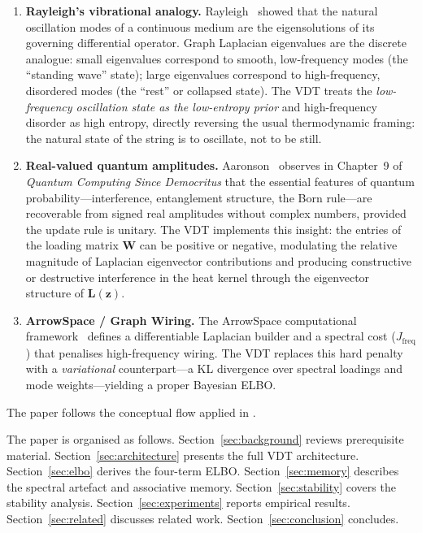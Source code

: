 \documentclass[11pt,a4paper]{article}
\newcommand{\Lmat}{\mathbf{L}}
\newcommand{\Wmat}{\mathbf{W}}
\begin{document}
\begin{enumerate}
  \item \textbf{Rayleigh's vibrational analogy.}
        Rayleigh~\cite{rayleigh1877} showed that the natural oscillation modes
        of a continuous medium are the eigensolutions of its governing
        differential operator.  Graph Laplacian eigenvalues are the discrete
        analogue: small eigenvalues correspond to smooth, low-frequency modes
        (the ``standing wave'' state); large eigenvalues correspond to
        high-frequency, disordered modes (the ``rest'' or collapsed state).
        The VDT treats the \emph{low-frequency oscillation state as the
        low-entropy prior} and high-frequency disorder as high entropy,
        directly reversing the usual thermodynamic framing: the natural state
        of the string is to oscillate, not to be still.

  \item \textbf{Real-valued quantum amplitudes.}
        Aaronson~\cite{aaronson2013} observes in Chapter~9 of
        \emph{Quantum Computing Since Democritus} that the essential features
        of quantum probability---interference, entanglement structure,
        the Born rule---are recoverable from signed real amplitudes without
        complex numbers, provided the update rule is unitary.
        The VDT implements this insight: the entries of the loading matrix
        $\Wmat$ can be positive or negative, modulating the relative
        magnitude of Laplacian eigenvector contributions and producing
        constructive or destructive interference in the heat kernel through
        the eigenvector structure of $\Lmat(\mathbf{z})$.

  \item \textbf{ArrowSpace / Graph Wiring.}
        The ArrowSpace computational framework~\cite{moriondo2026arrowspace}
        defines a differentiable Laplacian builder and a spectral cost
        ($J_{\text{freq}}$) that penalises high-frequency wiring.
        The VDT replaces this hard penalty with a \emph{variational}
        counterpart---a KL divergence over spectral loadings and mode
        weights---yielding a proper Bayesian ELBO.
\end{enumerate}

The paper follows the conceptual flow applied in \cite{chen2026}.

The paper is organised as follows.
Section~\ref{sec:background} reviews prerequisite material.
Section~\ref{sec:architecture} presents the full VDT architecture.
Section~\ref{sec:elbo} derives the four-term ELBO.
Section~\ref{sec:memory} describes the spectral artefact and associative memory.
Section~\ref{sec:stability} covers the stability analysis.
Section~\ref{sec:experiments} reports empirical results.
Section~\ref{sec:related} discusses related work.
Section~\ref{sec:conclusion} concludes.
\end{document}
